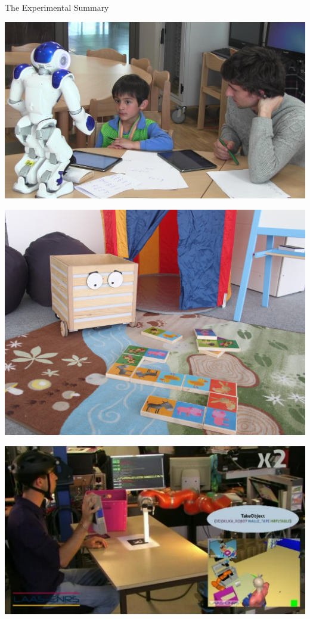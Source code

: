 \documentclass[compress]{beamer}
\begin{document}
{\begin{frame}{The Experimental Summary}
\begin{multicols}{4}
        \includegraphics[width=\columnwidth]{realSetup}

        \includegraphics[width=\columnwidth]{ranger-background}

        \includegraphics[width=\columnwidth]{cleantable}


\end{multicols}
\end{frame}}
\end{document}
